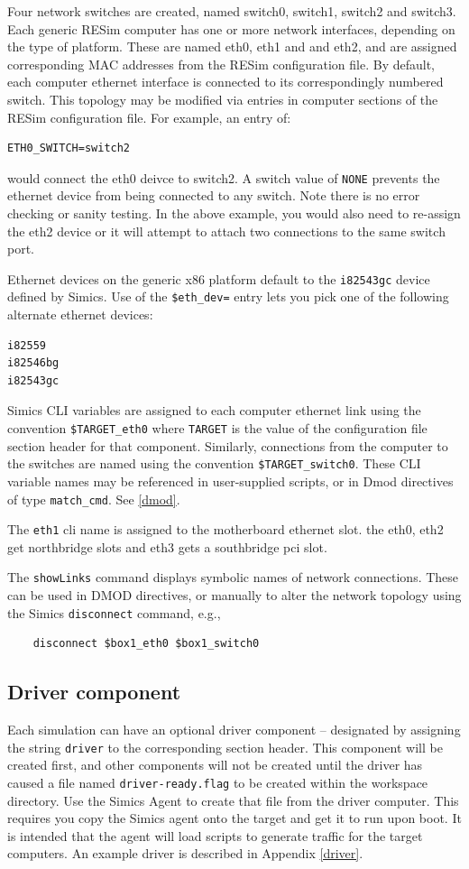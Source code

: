\documentclass[titlepage]{article}
\begin{document}
Four network switches are created, named switch0, switch1, switch2 and switch3.   Each generic RESim computer has one or more network interfaces,
depending on the type of platform.
These are named eth0, eth1 and and eth2, and are assigned corresponding MAC addresses from the
RESim configuration file. By default, each computer ethernet interface is connected to its correspondingly numbered switch.
This topology may be modified via entries in computer sections of the RESim configuration file.  For example, an entry of:
\begin{verbatim}
ETH0_SWITCH=switch2
\end{verbatim}
\noindent would connect the eth0 deivce to switch2.  A switch value of {\tt NONE} prevents the ethernet device from being connected
to any switch.  Note there is no error checking or sanity testing.  In the above example, you would also need to re-assign the eth2 device
or it will attempt to attach two connections to the same switch port.

Ethernet devices on the generic x86 platform default to the {\tt i82543gc} device defined by Simics.  Use of the {\tt \$eth\_dev=} 
entry lets you pick one of the following alternate ethernet devices:
\begin{verbatim}
i82559
i82546bg
i82543gc
\end{verbatim}

Simics CLI variables are assigned to each computer ethernet link using the convention {\tt \$TARGET\_eth0} where {\tt TARGET}
is the value of the configuration file section header for that component.  Similarly, connections from the computer to the switches 
are named using the convention {\tt \$TARGET\_switch0}.  These CLI variable names may be referenced in user-supplied scripts, or in 
Dmod directives of type {\tt match\_cmd}.  See \ref{dmod}.

The {\tt eth1} cli name is assigned to the motherboard ethernet slot. the eth0, eth2 get northbridge slots and eth3 gets a southbridge pci slot.

The {\tt showLinks} command displays symbolic names of network connections.  These can be used in DMOD directives, or manually to alter
the network topology using the Simics {\tt disconnect} command, e.g., 
\begin{verbatim}
    disconnect $box1_eth0 $box1_switch0
\end{verbatim}

\subsection{Driver component}
Each simulation can have an optional driver component -- designated by assigning the string {\tt driver} to the corresponding
section header.  This component will be created first, and other components will not be created until the driver has
caused a file named {\tt driver-ready.flag} to be created within the workspace directory.  Use the Simics Agent to 
create that file from the driver computer.  This requires you copy the Simics agent onto the target and get it to run
upon boot.  It is intended that the agent will load scripts to generate traffic for the target computers.  
An example driver is described in Appendix \ref{driver}.   
\end{document}
